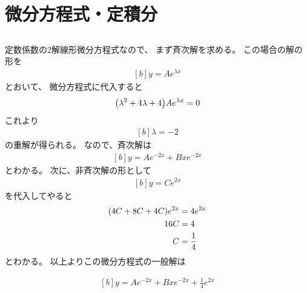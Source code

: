 \documentclass[../ap_2013.tex]{subfiles}
\begin{document}
\setcounter{chapter}{0}
\chapter{微分方程式・定積分}
\section{}
\subsection{}
定数係数の2解線形微分方程式なので、
まず斉次解を求める。
この場合の解の形を
\begin{equation}\begin{aligned}[b]
    y = Ae^{\lambda x}
\end{aligned}\end{equation}
とおいて、
微分方程式に代入すると
\begin{equation}\begin{aligned}[b]
    \qty(\lambda^2+4\lambda+4)Ae^{\lambda x} = 0
\end{aligned}\end{equation}
これより
\begin{equation}\begin{aligned}[b]
    \lambda = -2
\end{aligned}\end{equation}
の重解が得られる。
なので、斉次解は
\begin{equation}\begin{aligned}[b]
    y = Ae^{-2x} +Bxe^{-2x}
\end{aligned}\end{equation}
とわかる。
次に、非斉次解の形として
\begin{equation}\begin{aligned}[b]
    y = Ce^{2x}
\end{aligned}\end{equation}
を代入してやると
\begin{equation}\begin{aligned}[b]
    \qty(4C+8C+4C)e^{2x}&=4e^{2x}\\
    16 C &= 4\\
    C &= \frac{1}{4}
\end{aligned}\end{equation}
とわかる。
以上よりこの微分方程式の一般解は

\begin{equation}\begin{aligned}[b]
    y=Ae^{-2x}+Bxe^{-2x}+\frac{1}{4}e^{2x}
\end{aligned}\end{equation}
\end{document}
